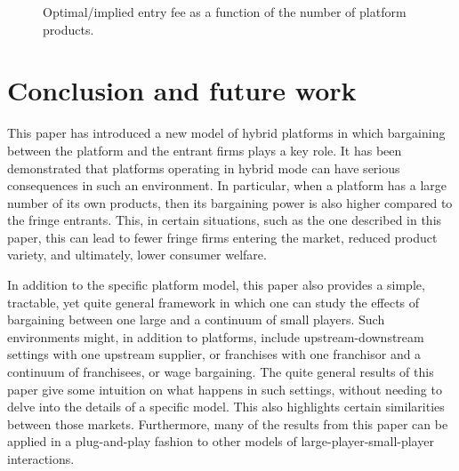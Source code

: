 \documentclass[a4paper]{article}
\begin{document}
\begin{figure}
    \centering
    \caption{Optimal/implied entry fee as a function of the number of platform products.}
    \label{fig:F_F_eq}
\end{figure}





\section{Conclusion and future work}

This paper has introduced a new model of hybrid platforms in which bargaining between the platform and the entrant firms plays a key role.
It has been demonstrated that platforms operating in hybrid mode can have serious consequences in such an environment.
In particular, when a platform has a large number of its own products, then its bargaining power is also higher compared to the fringe entrants.
This, in certain situations, such as the one described in this paper, this can lead to fewer fringe firms entering the market, reduced product variety, and ultimately, lower consumer welfare.

In addition to the specific platform model, this paper also provides a simple, tractable, yet quite general framework in which one can study the effects of bargaining between one large and a continuum of small players.
Such environments might, in addition to platforms, include upstream-downstream settings with one upstream supplier, or franchises with one franchisor and a continuum of franchisees, or wage bargaining.
The quite general results of this paper give some intuition on what happens in such settings, without needing to delve into the details of a specific model.
This also highlights certain similarities between those markets.
Furthermore, many of the results from this paper can be applied in a plug-and-play fashion to other models of large-player-small-player interactions.
\end{document}
